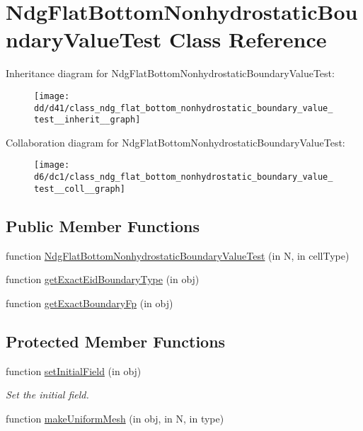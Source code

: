 \hypertarget{class_ndg_flat_bottom_nonhydrostatic_boundary_value_test}{}\section{Ndg\+Flat\+Bottom\+Nonhydrostatic\+Boundary\+Value\+Test Class Reference}
\label{class_ndg_flat_bottom_nonhydrostatic_boundary_value_test}


Inheritance diagram for Ndg\+Flat\+Bottom\+Nonhydrostatic\+Boundary\+Value\+Test\+:
\nopagebreak
\begin{figure}[H]
\begin{center}
\leavevmode
\texttt{[image: dd/d41/class\_ndg\_flat\_bottom\_nonhydrostatic\_boundary\_value\_test\_\_inherit\_\_graph]}
\end{center}
\end{figure}


Collaboration diagram for Ndg\+Flat\+Bottom\+Nonhydrostatic\+Boundary\+Value\+Test\+:
\nopagebreak
\begin{figure}[H]
\begin{center}
\leavevmode
\texttt{[image: d6/dc1/class\_ndg\_flat\_bottom\_nonhydrostatic\_boundary\_value\_test\_\_coll\_\_graph]}
\end{center}
\end{figure}
\subsection*{Public Member Functions}
\begin{DoxyCompactItemize}
\item 
function \hyperlink{class_ndg_flat_bottom_nonhydrostatic_boundary_value_test_aa2d6d73974c64e1ec7776bbdca377254}{Ndg\+Flat\+Bottom\+Nonhydrostatic\+Boundary\+Value\+Test} (in N, in cell\+Type)
\item 
function \hyperlink{class_ndg_flat_bottom_nonhydrostatic_boundary_value_test_a4d0442a8f9a8cb1119af741614ff629a}{get\+Exact\+Eid\+Boundary\+Type} (in obj)
\item 
function \hyperlink{class_ndg_flat_bottom_nonhydrostatic_boundary_value_test_af9c82c640bf4b6d990dc7032d3c3c596}{get\+Exact\+Boundary\+Fp} (in obj)
\end{DoxyCompactItemize}
\subsection*{Protected Member Functions}
\begin{DoxyCompactItemize}
\item 
function \hyperlink{class_ndg_flat_bottom_nonhydrostatic_boundary_value_test_a45ad1c26a932faa1e3a56cf50cbacda7}{set\+Initial\+Field} (in obj)
\begin{DoxyCompactList}\small\item\em Set the initial field. \end{DoxyCompactList}\item 
function \hyperlink{class_ndg_flat_bottom_nonhydrostatic_boundary_value_test_ae4bf773119f9cea27858a46a9debfc95}{make\+Uniform\+Mesh} (in obj, in N, in type)
\end{DoxyCompactItemize}
